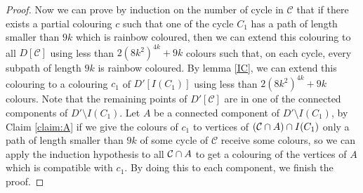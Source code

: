 \documentclass[utf8,10pt]{article}
\theoremstyle{plain}
\newtheorem{lemma}[theorem]{Lemma}
\theoremstyle{definition}
\theoremstyle{remark}
\begin{document}
\begin{proof}
Now we can prove by induction on the number of cycle in $\mathcal{C}$ that if there exists
a partial colouring $c$ such that one of the cycle $C_1$ has a path of length smaller than $9k$
which is rainbow coloured, then we can extend this colouring to all $D[\mathcal{C}]$ using less
than $2(8k^2)^{4k} +9k$ colours such that, on each cycle, every subpath of length
$9k$ is rainbow coloured. By lemma \ref{IC}, we can extend this colouring to a colouring $c_1$ of $D'[I(C_1)]$
using less than $2(8k^2)^{4k} + 9k$ colours.
Note that the remaining points of $D'[\mathcal{C}]$ are in one of the connected components of $D'\setminus I(C_1)$.
Let $A$ be a connected component of $D'\setminus I(C_1)$, by Claim \ref{claim:A} if we give the colours of $c_1$ to vertices of $({\cal C}\cap A) \cap I(C_1)$
only a path of length smaller than $9k$ of some cycle of $\mathcal{C}$ receive some colours,
so we can apply the induction hypothesis to all ${\cal C}\cap A$ to get a colouring
of the vertices of $A$ which is compatible with $c_1$. By doing this to each component, we finish the proof.


\medskip

%
%
%
%







\end{proof}
\end{document}
